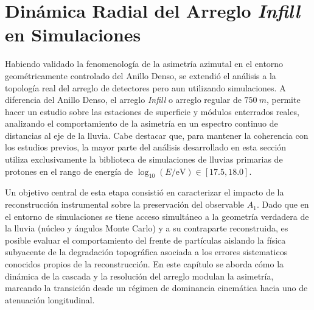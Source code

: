 %
%

\section{Dinámica Radial del Arreglo \textit{Infill} en Simulaciones}
\label{cap:infill}

Habiendo validado la fenomenología de la asimetría azimutal en el entorno geométricamente controlado del Anillo Denso, se extendió el análisis a la topología real del arreglo de detectores pero aun utilizando simulaciones. A diferencia del Anillo Denso, el arreglo \textit{Infill} o arreglo regular de $750~m$, permite hacer un estudio sobre las estaciones de superficie y módulos enterrados reales, analizando el comportamiento de la asimetría en un espectro continuo de distancias al eje de la lluvia. Cabe destacar que, para mantener la coherencia con los estudios previos, la mayor parte del análisis desarrollado en esta sección utiliza exclusivamente la biblioteca de simulaciones de lluvias primarias de protones en el rango de energía de $\log_{10}(E/\mathrm{eV}) \in [17.5, 18.0]$.

Un objetivo central de esta etapa consistió en caracterizar el impacto de la reconstrucción instrumental sobre la preservación del observable $A_1$. Dado que en el entorno de simulaciones se tiene acceso simultáneo a la geometría verdadera de la lluvia (núcleo y ángulos Monte Carlo) y a su contraparte reconstruida, es posible evaluar el comportamiento del frente de partículas aislando la física subyacente de la degradación topográfica asociada a los errores sistematicos conocidos propios de la reconstrucción. En este capítulo se aborda cómo la dinámica de la cascada y la resolución del arreglo modulan la asimetría, marcando la transición desde un régimen de dominancia cinemática hacia uno de atenuación longitudinal.


